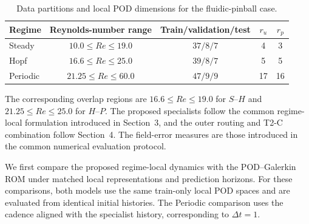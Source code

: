 \begin{table}[htbp]
\centering
\caption{Data partitions and local POD dimensions for the fluidic-pinball
case.}
\label{tab:pinball_data_contracts}

\small
\renewcommand{\arraystretch}{1.10}
\setlength{\tabcolsep}{8pt}

\begin{tabular}{@{}lcccc@{}}
\toprule
Regime
& Reynolds-number range
& Train/validation/test
& $r_u$
& $r_p$ \\
\midrule

Steady
& $10.0\le Re\le19.0$
& $37/8/7$
& 4
& 3 \\

Hopf
& $16.6\le Re\le25.0$
& $39/8/7$
& 5
& 5 \\

Periodic
& $21.25\le Re\le60.0$
& $47/9/9$
& 17
& 16 \\

\bottomrule
\end{tabular}
\end{table}

The corresponding overlap regions are
$16.6\le Re\le19.0$ for $S$--$H$ and
$21.25\le Re\le25.0$ for $H$--$P$. The proposed specialists follow the
common regime-local formulation introduced in Section~3, and the outer
routing and T2-C combination follow Section~4. The field-error measures are
those introduced in the common numerical evaluation protocol.

We first compare the proposed regime-local dynamics with the
POD--Galerkin ROM under matched local representations and
prediction horizons. For these comparisons, both models use the same
train-only local POD spaces and are evaluated from identical initial
histories. The Periodic comparison uses the cadence aligned with the
specialist history, corresponding to $\Delta t=1$.

